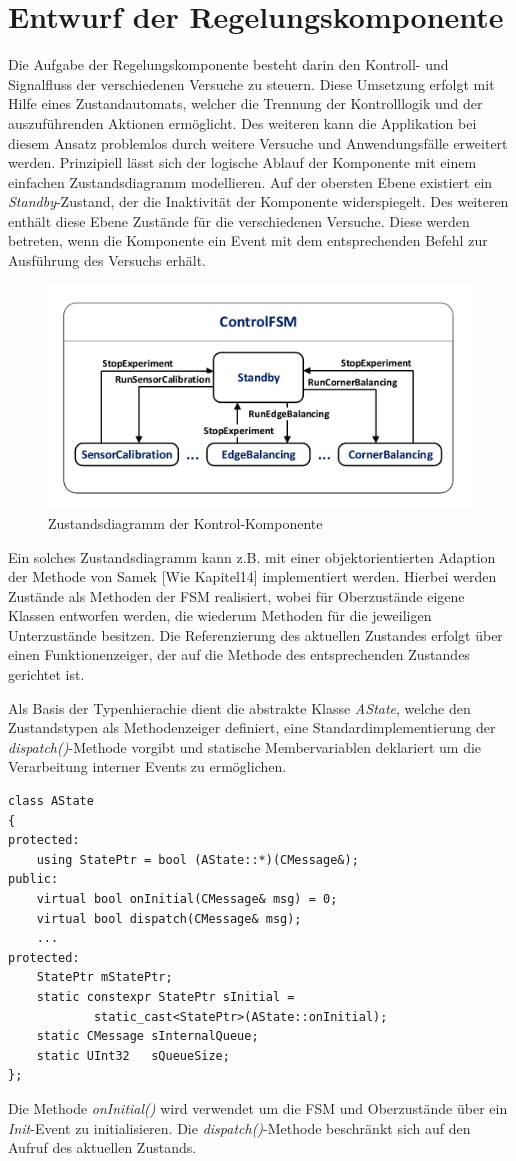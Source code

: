 \section{Entwurf der Regelungskomponente}
Die Aufgabe der Regelungskomponente besteht darin den Kontroll- und Signalfluss der verschiedenen Versuche zu steuern. Diese Umsetzung erfolgt mit Hilfe eines Zustandautomats, welcher die Trennung der Kontrolllogik und der auszuführenden Aktionen ermöglicht. Des weiteren kann die Applikation bei diesem Ansatz problemlos durch weitere Versuche und Anwendungsfälle erweitert werden. 
Prinzipiell lässt sich der logische Ablauf der Komponente mit einem einfachen Zustandsdiagramm modellieren. Auf der obersten Ebene existiert ein \textit{Standby}-Zustand, der die Inaktivität der Komponente widerspiegelt. Des weiteren enthält diese Ebene Zustände für die verschiedenen Versuche. Diese werden betreten, wenn die Komponente ein Event mit dem entsprechenden Befehl zur Ausführung des Versuchs erhält.
\begin{figure}[h!]
\centering
\includegraphics[width=0.7\linewidth]{img/SW_2_ControlComp_SC.pdf}
\caption{Zustandsdiagramm der Kontrol-Komponente}
\end{figure}

Ein solches Zustandsdiagramm kann z.B. mit einer objektorientierten Adaption der Methode von Samek [Wie Kapitel14] implementiert werden. Hierbei werden Zustände als Methoden der FSM realisiert, wobei für Oberzustände eigene Klassen entworfen werden, die wiederum Methoden für die jeweiligen Unterzustände besitzen. Die Referenzierung des aktuellen Zustandes erfolgt über einen Funktionenzeiger, der auf die Methode des entsprechenden Zustandes gerichtet ist. 

Als Basis der Typenhierachie dient die abstrakte Klasse \textit{AState}, welche den Zustandstypen als Methodenzeiger definiert, eine Standardimplementierung der \textit{dispatch()}-Methode vorgibt und statische Membervariablen deklariert um die Verarbeitung interner Events zu ermöglichen.
\begin{lstlisting}[caption={Implementierung der abstrakten Zustandsklasse},captionpos=b]
class AState
{
protected:
	using StatePtr = bool (AState::*)(CMessage&);
public:
	virtual bool onInitial(CMessage& msg) = 0;
	virtual bool dispatch(CMessage& msg);
	...
protected:
	StatePtr mStatePtr;
	static constexpr StatePtr sInitial = 
			static_cast<StatePtr>(AState::onInitial);
	static CMessage sInternalQueue;
	static UInt32   sQueueSize;
};
\end{lstlisting}
Die Methode \textit{onInitial()} wird verwendet um die FSM und Oberzustände über ein \textit{Init}-Event zu initialisieren. Die \textit{dispatch()}-Methode beschränkt sich auf den Aufruf des aktuellen Zustands.

